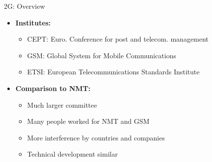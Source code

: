 \begin{frame}{2G: Overview}
  \begin{itemize}
    \item \textbf{Institutes:}
    \begin{itemize}
      \item CEPT: Euro. Conference for post and telecom. management
      \item GSM: Global System for Mobile Communications
      \item ETSI: European Telecommunications Standards Institute
    \end{itemize}
    \item \textbf{Comparison to NMT:}
    \begin{itemize}
      \item Much larger committee
      \item Many people worked for NMT and GSM 
      \item More interference by countries and companies
      \item Technical development similar
    \end{itemize}
  \end{itemize}
  
\end{frame}

